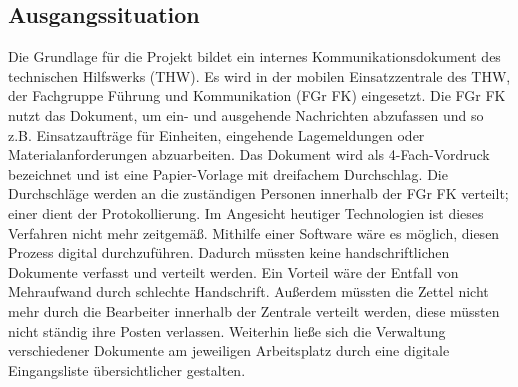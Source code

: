 \subsection{Ausgangssituation}
Die Grundlage für die Projekt bildet ein internes Kommunikationsdokument des technischen Hilfswerks (THW). Es wird in der mobilen Einsatzzentrale des THW, der Fachgruppe Führung und Kommunikation (FGr FK) eingesetzt. Die FGr FK nutzt das Dokument, um ein- und ausgehende Nachrichten abzufassen und so z.B. Einsatzaufträge für Einheiten, eingehende Lagemeldungen oder Materialanforderungen abzuarbeiten. Das Dokument wird als 4-Fach-Vordruck bezeichnet und ist eine Papier-Vorlage mit dreifachem Durchschlag. Die Durchschläge werden an die zuständigen Personen innerhalb der FGr FK verteilt; einer dient der Protokollierung. Im Angesicht heutiger Technologien ist dieses Verfahren nicht mehr zeitgemäß. Mithilfe einer Software wäre es möglich, diesen Prozess digital durchzuführen. Dadurch müssten keine handschriftlichen Dokumente verfasst und verteilt werden. Ein Vorteil wäre der Entfall von Mehraufwand durch schlechte Handschrift. Außerdem müssten die Zettel nicht mehr durch die Bearbeiter innerhalb der Zentrale verteilt werden, diese müssten nicht ständig ihre Posten verlassen. Weiterhin ließe sich die Verwaltung verschiedener Dokumente am jeweiligen Arbeitsplatz durch eine digitale Eingangsliste übersichtlicher gestalten.